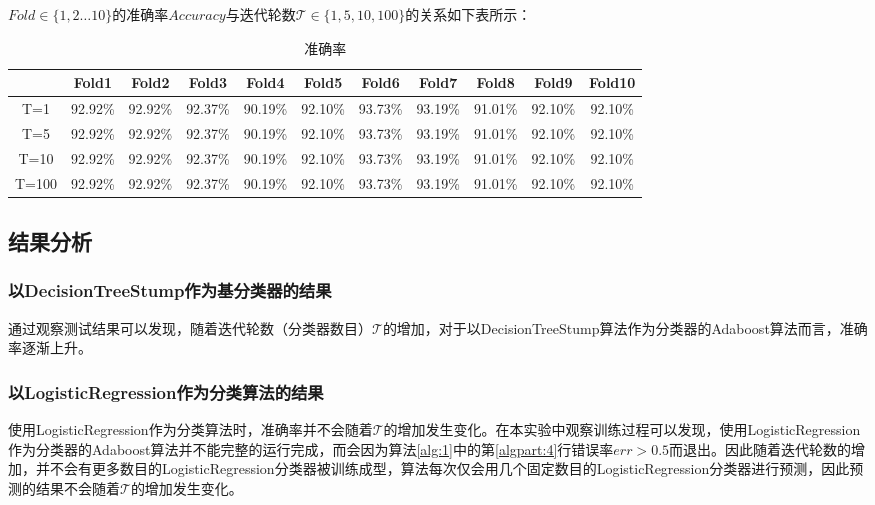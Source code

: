 \documentclass{paper}
\begin{document}
$Fold \in \{1, 2 \dots 10\}$的准确率$Accuracy$与迭代轮数$\mathcal{T} \in \{1, 5, 10, 100\}$的关系如下表所示：

\begin{table}[htbp]
	\centering
	\caption{准确率}
	\begin{tabular}{|c|c|c|c|c|c|c|c|c|c|c|}
		\hline
		      & Fold1 & Fold2 & Fold3 & Fold4 & Fold5 & Fold6 & Fold7 & Fold8 & Fold9 & Fold10 \\ \hline
		T=1 & 92.92\% & 92.92\% & 92.37\% & 90.19\% & 92.10\% & 93.73\% & 93.19\% & 91.01\% & 92.10\% & 92.10\% \\ \hline 
        T=5 & 92.92\% & 92.92\% & 92.37\% & 90.19\% & 92.10\% & 93.73\% & 93.19\% & 91.01\% & 92.10\% & 92.10\% \\ \hline
        T=10 & 92.92\% & 92.92\% & 92.37\% & 90.19\% & 92.10\% & 93.73\% & 93.19\% & 91.01\% & 92.10\% & 92.10\% \\ \hline
        T=100 & 92.92\% & 92.92\% & 92.37\% & 90.19\% & 92.10\% & 93.73\% & 93.19\% & 91.01\% & 92.10\% & 92.10\%  \\ \hline
	\end{tabular}
\end{table}

\subsection{结果分析}\label{result}

\subsubsection{以DecisionTreeStump作为基分类器的结果}

通过观察测试结果可以发现，随着迭代轮数（分类器数目）$\mathcal{T}$的增加，对于以DecisionTreeStump算法作为分类器的Adaboost算法而言，准确率逐渐上升。

\subsubsection{以LogisticRegression作为分类算法的结果}

使用LogisticRegression作为分类算法时，准确率并不会随着$\mathcal{T}$的增加发生变化。在本实验中观察训练过程可以发现，使用LogisticRegression作为分类器的Adaboost算法并不能完整的运行完成，而会因为算法\ref{alg:1}中的第\ref{algpart:4}行错误率$err > 0.5$而退出。因此随着迭代轮数的增加，并不会有更多数目的LogisticRegression分类器被训练成型，算法每次仅会用几个固定数目的LogisticRegression分类器进行预测，因此预测的结果不会随着$\mathcal{T}$的增加发生变化。
\end{document}
